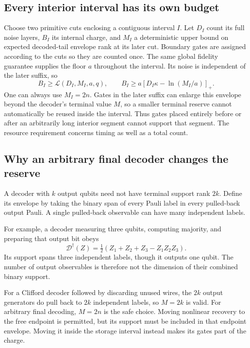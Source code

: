 \documentclass[11pt,a4paper]{article}
\numberwithin{equation}{section}
\theoremstyle{remark}\newtheorem*{remark}{Interpretation}
\newcommand{\positive}[1]{\left[#1\right]_+}
\begin{document}
\subsection{Every interior interval has its own budget}
Choose two primitive cuts enclosing a contiguous interval $I$. Let $D_I$ count its full noise layers, $B_I$ its internal charge, and $M_I$ a deterministic upper bound on expected decoded-tail envelope rank at its later cut. Boundary gates are assigned according to the cuts so they are counted once. The same global fidelity guarantee supplies the floor $a$ throughout the interval. Its noise is independent of the later suffix, so
\begin{equation}
B_I\ge\mathcal L(D_I,M_I,a,q),\qquad
B_I\ge a\positive{D_I\kappa-\ln(M_I/a)}.
\end{equation}
One can always use $M_I=2n$. Gates in the later suffix can enlarge this envelope beyond the decoder's terminal value $M$, so a smaller terminal reserve cannot automatically be reused inside the interval. Thus gates placed entirely before or after an arbitrarily long interior segment cannot support that segment. The resource requirement concerns timing as well as a total count.

\subsection{Why an arbitrary final decoder changes the reserve}
A decoder with $k$ output qubits need not have terminal support rank $2k$. Define its envelope by taking the binary span of every Pauli label in every pulled-back output Pauli. A single pulled-back observable can have many independent labels.

For example, a decoder measuring three qubits, computing majority, and preparing that output bit obeys
\begin{equation}
\mathcal D^\dagger(Z)
=\tfrac12(Z_1+Z_2+Z_3-Z_1Z_2Z_3).
\end{equation}
Its support spans three independent labels, though it outputs one qubit. The number of output observables is therefore not the dimension of their combined binary support.

For a Clifford decoder followed by discarding unused wires, the $2k$ output generators do pull back to $2k$ independent labels, so $M=2k$ is valid. For arbitrary final decoding, $M=2n$ is the safe choice. Moving nonlinear recovery to the free endpoint is permitted, but its support must be included in that endpoint envelope. Moving it inside the storage interval instead makes its gates part of the charge.
\end{document}
